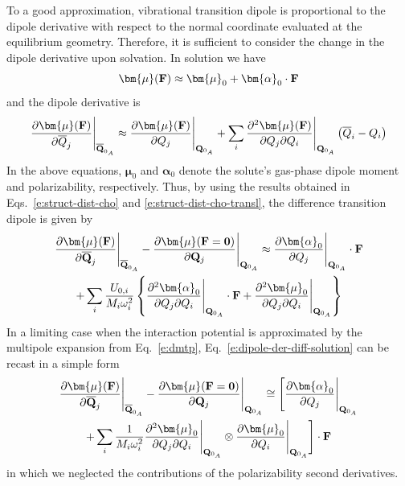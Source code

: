 \documentclass[b5paper,oneside,fleqn,11pt]{book}
\newcommand{\BM}[1]{\bm{#1}}
\begin{document}
\begin{refsection}
To a good approximation, vibrational transition dipole is proportional to the dipole derivative 
with respect to the normal coordinate evaluated at the equilibrium geometry.
Therefore, it is sufficient to consider the change in the dipole derivative
upon solvation. In solution we have
%
\begin{equation} \label{e:dipole-solution}
{\BM \mu}({\bf F}) \approx {\BM \mu}_0 + {\BM \alpha}_0 \cdot {\bf F}
\end{equation}
%
and the dipole derivative is
%
\begin{equation} \label{e:dipole-der-solution}
 \frac{\partial{\BM \mu}({\bf F})}{\partial\overline{Q}_j} \Bigg|_{\overline{\bf Q}_{0_A}}
\approx 
 \frac{\partial{\BM \mu}({\bf F})}{\partial Q_j} \Bigg|_{{\bf Q}_{0_A}}
+
\sum_i \frac{\partial^2{\BM \mu}({\bf F})}{\partial Q_j \partial Q_i} \Bigg|_{{\bf Q}_{0_A}}
\left( \overline{Q}_i - Q_i\right)
\end{equation}
%
In the above equations, ${\BM \mu}_0$ and ${\BM \alpha}_0$ denote 
the solute's gas\hyp{}phase dipole moment
and polarizability, respectively.
Thus, by using the results obtained in Eqs.~\eqref{e:struct-dist-cho} 
and \eqref{e:struct-dist-cho-transl},
the difference transition dipole is given by
%
\begin{multline} \label{e:dipole-der-diff-solution}
\frac{\partial{\BM \mu}({\bf F})}{\partial\overline {\bf Q}_j} \Bigg|_{\overline{\bf Q}_{0_A}} -  
 \frac{\partial{\BM \mu}({\bf F}={\bf 0})}{\partial {\bf Q}_j} \Bigg|_{{\bf Q}_{0_A}} \approx
%
\frac{\partial{\BM \alpha}_0}{\partial Q_j} \Bigg|_{{\bf Q}_{0_A}} \cdot {\bf F}
\\+
\sum_i \frac{U_{0,i}}{M_i\omega_i^2} 
\left\{
\frac{\partial^2{\BM \alpha}_0}{\partial Q_j \partial Q_i} \Bigg|_{{\bf Q}_{0_A}} \cdot {\bf F}
+
\frac{\partial^2{\BM \mu}_0}{\partial Q_j \partial Q_i} \Bigg|_{{\bf Q}_{0_A}}
\right\}
\end{multline}
%
In a limiting case when
the interaction potential is approximated by the multipole expansion from
Eq.~\eqref{e:dmtp}, 
Eq.~\eqref{e:dipole-der-diff-solution} can be recast 
in a simple form
%
\begin{multline} \label{e:dipole-der-diff-solution-field}
 \frac{\partial{\BM \mu}({\bf F})}{\partial\overline {\bf Q}_j} \Bigg|_{\overline{\bf Q}_{0_A}} -  
 \frac{\partial{\BM \mu}({\bf F}={\bf 0})}{\partial {\bf Q}_j} \Bigg|_{{\bf Q}_{0_A}} \cong
%
\Bigg[
\frac{\partial {\BM \alpha}_0}{\partial Q_j} \Bigg|_{{\bf Q}_{0_A}} 
\\+ 
\sum_i \frac{1}{M_i\omega_i^2} 
\frac{\partial^2 {\BM \mu}_0}{\partial Q_j \partial Q_i} \Bigg|_{{\bf Q}_{0_A}}
\otimes
\frac{\partial {\BM \mu}_0}{\partial Q_i} \Bigg|_{{\bf Q}_{0_A}}
\Bigg] 
\cdot {\bf F}
\end{multline}
%
in which we neglected the contributions of the polarizability second derivatives.


\end{refsection}
\end{document}
